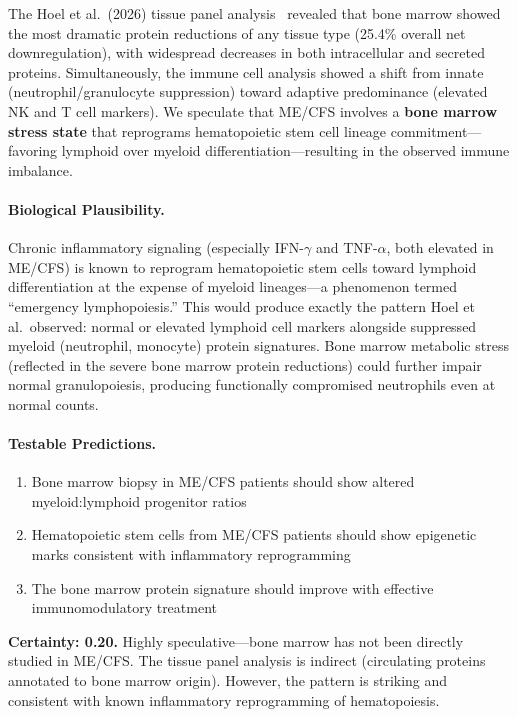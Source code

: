 \begin{speculation}
\label{spec:bone-marrow-reprogramming}

The Hoel et al.\ (2026) tissue panel analysis~\cite{Hoel2026proteome} revealed that bone marrow showed the most dramatic protein reductions of any tissue type (25.4\% overall net downregulation), with widespread decreases in both intracellular and secreted proteins. Simultaneously, the immune cell analysis showed a shift from innate (neutrophil/granulocyte suppression) toward adaptive predominance (elevated NK and T cell markers). We speculate that ME/CFS involves a \textbf{bone marrow stress state} that reprograms hematopoietic stem cell lineage commitment---favoring lymphoid over myeloid differentiation---resulting in the observed immune imbalance.

\paragraph{Biological Plausibility.}
Chronic inflammatory signaling (especially IFN-$\gamma$ and TNF-$\alpha$, both elevated in ME/CFS) is known to reprogram hematopoietic stem cells toward lymphoid differentiation at the expense of myeloid lineages---a phenomenon termed ``emergency lymphopoiesis.'' This would produce exactly the pattern Hoel et al.\ observed: normal or elevated lymphoid cell markers alongside suppressed myeloid (neutrophil, monocyte) protein signatures. Bone marrow metabolic stress (reflected in the severe bone marrow protein reductions) could further impair normal granulopoiesis, producing functionally compromised neutrophils even at normal counts.

\paragraph{Testable Predictions.}
\begin{enumerate}
    \item Bone marrow biopsy in ME/CFS patients should show altered myeloid:lymphoid progenitor ratios
    \item Hematopoietic stem cells from ME/CFS patients should show epigenetic marks consistent with inflammatory reprogramming
    \item The bone marrow protein signature should improve with effective immunomodulatory treatment
\end{enumerate}

\textbf{Certainty: 0.20.} Highly speculative---bone marrow has not been directly studied in ME/CFS. The tissue panel analysis is indirect (circulating proteins annotated to bone marrow origin). However, the pattern is striking and consistent with known inflammatory reprogramming of hematopoiesis.
\end{speculation}

